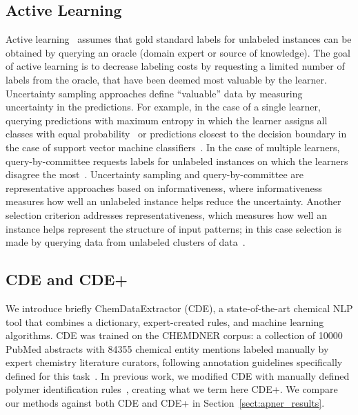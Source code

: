 \subsection{Active Learning}\label{sec:active}
Active learning~\cite{zhou2017brief} assumes that gold standard labels for unlabeled instances can be obtained by
querying an oracle (domain expert or source of knowledge).
The goal of active learning is to decrease labeling costs by requesting a limited number of labels from the oracle, that have been deemed most valuable by the learner.
Uncertainty sampling approaches define ``valuable'' data by measuring uncertainty in the predictions.
For example, in the case of a single learner, querying predictions with maximum entropy in which the learner assigns all classes with equal probability~\cite{lewis1994heterogeneous} or predictions closest to the decision boundary in the case of support vector machine classifiers~\cite{campbell2000query}.
In the case of multiple learners, query-by-committee requests labels for unlabeled instances on which the learners disagree the most~\cite{seung1992query}.
Uncertainty sampling and query-by-committee are representative approaches based on informativeness, where informativeness measures how well an unlabeled instance helps reduce the uncertainty. 
Another selection criterion addresses representativeness, which measures how well an instance helps represent the structure of input patterns; in this case selection is made by querying data from unlabeled clusters of data~\cite{nguyen2004active,dasgupta2008hierarchical}.

\subsection{CDE and CDE+}\label{sec:cde}
We introduce briefly ChemDataExtractor (CDE),
a state-of-the-art chemical NLP tool that combines a dictionary, expert-created
rules, and machine learning algorithms.
CDE was trained on the CHEMDNER corpus:
a collection of \num{10000} PubMed abstracts with \num{84355} chemical entity mentions labeled manually by expert chemistry literature curators, following annotation guidelines specifically defined for this task~\cite{krallinger2015chemdner}.
In previous work, we modified CDE with
manually defined polymer identification rules~\cite{tchoua2017towards}, creating what we term here CDE+.
We compare our methods against both CDE and CDE+ in Section~\ref{sect:apner_results}.

